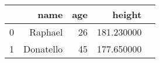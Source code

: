 \begin{table}[h]
\centering
\label{table:5}
\begin{tabular}{rrrrr}
\toprule
 & name & age & height \\
\midrule
0 & Raphael & 26 & 181.230000 \\
1 & Donatello & 45 & 177.650000 \\
\bottomrule
\end{tabular}
\end{table}
